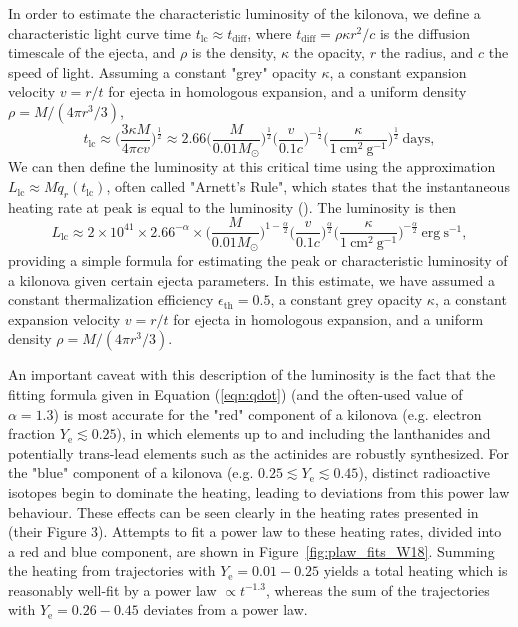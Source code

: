 \documentclass[twocolumn]{aastex63}
\begin{document}
In order to estimate the characteristic luminosity of the kilonova, we define a characteristic light curve time $t_{\mathrm{lc}} \approx t_{\mathrm{diff}}$, where $t_{\mathrm{diff}} = \rho \kappa r^2 / c$ is the diffusion timescale of the ejecta, and $\rho$ is the density, $\kappa$ the opacity, $r$ the radius, and $c$ the speed of light. Assuming a constant "grey" opacity $\kappa$, a constant expansion velocity $v=r/t$ for ejecta in homologous expansion, and a uniform density $\rho=M/(4\pi r^3 / 3)$,
\begin{equation}
t_{\mathrm{lc}} \approx \Big(\frac{3 \kappa M}{4 \pi c v}\Big)^{\frac{1}{2}} \approx 2.66 \Big(\frac{M}{0.01 M_{\odot}}\Big)^{\frac{1}{2}} \Big( \frac{v}{0.1c} \Big)^{-\frac{1}{2}} \Big( \frac{\kappa}{1~\mathrm{cm^2~g^{-1}}}\Big)^{\frac{1}{2}}~\mathrm{days} ,
\end{equation}
We can then define the luminosity at this critical time using the approximation $L_{\mathrm{lc}} \approx M \dot{q}_r (t_{\mathrm{lc}})$, often called "Arnett's Rule", which states that the instantaneous heating rate at peak is equal to the luminosity (\citealt{arnett82}). The luminosity is then
\begin{equation}\label{eqn:lum}
L_{\mathrm{lc}} \approx 2 \times 10^{41} \times 2.66^{-\alpha} \times \Big(\frac{M}{0.01 M_{\odot}}\Big)^{1-\frac{\alpha}{2}} \Big( \frac{v}{0.1c} \Big)^{\frac{\alpha}{2}} \Big( \frac{\kappa}{1~\mathrm{cm^2~g^{-1}}}\Big)^{-\frac{\alpha}{2}}~\mathrm{erg~s^{-1}},
\end{equation}
providing a simple formula for estimating the peak or characteristic luminosity of a kilonova given certain ejecta parameters. In this estimate, we have assumed a constant thermalization efficiency $\epsilon_{\mathrm{th}} = 0.5$, a constant grey opacity $\kappa$, a constant expansion velocity $v=r/t$ for ejecta in homologous expansion, and a uniform density $\rho=M/(4\pi r^3 / 3)$.  

An important caveat with this description of the luminosity is the fact that the fitting formula given in Equation (\ref{eqn:qdot}) (and the often-used value of $\alpha=1.3$) is most accurate for the "red" component of a kilonova (e.g. electron fraction $Y_\mathrm{e}\lesssim0.25$), in which elements up to and including the lanthanides and potentially trans-lead elements such as the actinides are robustly synthesized. For the "blue" component of a kilonova (e.g. $0.25 \lesssim Y_\mathrm{e} \lesssim 0.45$), distinct radioactive isotopes begin to dominate the heating, leading to deviations from this power law behaviour. These effects can be seen clearly in the heating rates presented in \cite{wanajo18} (their Figure 3). Attempts to fit a power law to these heating rates, divided into a red and blue component, are shown in Figure~\ref{fig:plaw_fits_W18}. Summing the heating from trajectories with $Y_\mathrm{e}=0.01 - 0.25$ yields a total heating which is reasonably well-fit by a power law $\propto t^{-1.3}$, whereas the sum of the trajectories with $Y_\mathrm{e}=0.26 - 0.45$ deviates from a power law. 
\end{document}
